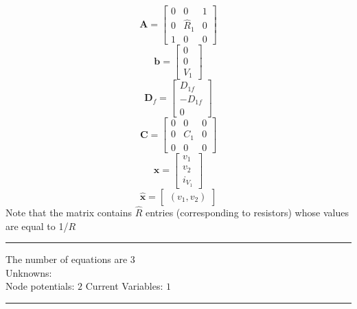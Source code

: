 \documentclass[a4paper,10pt]{report}
\begin{document}
\begin{equation}
\mathbf{A}=  
\left[ 
\begin{array}{ccc} 
0 &0  &1  \\ 
0 &\widehat{R}_1 &0  \\ 
1 &0  &0  
\end{array}
\right]
\end{equation} 
\begin{equation}
\mathbf{b}=  
\left[ 
\begin{array}{c} 
0  \\ 
0   \\ 
V_1  
\end{array}
\right]
\end{equation} 
\begin{equation}
\mathbf{D}_f=  
\left[ 
\begin{array}{c} 
D_{1f}  \\ 
-D_{1f}   \\ 
0  
\end{array}
\right]
\end{equation} 
\begin{equation}
\mathbf{C}=  
\left[ 
\begin{array}{ccc} 
0 &0  &0  \\ 
0 &C_1 &0  \\ 
0 &0  &0  
\end{array}
\right]
\end{equation} 
\begin{equation}
\mathbf{x}=  
\left[ 
\begin{array}{c} 
v_1   \\ 
v_2    \\ 
i_{V_1}  
\end{array}
\right]
\end{equation} 
\begin{equation}
\mathbf{\widehat{x}}=  
\left[ 
\begin{array}{c} 
(v_1,v_2)     
\end{array}
\right]
\end{equation} 
Note that the matrix contains $\widehat{R}$ entries (corresponding to resistors) whose values are equal to 1/$R$\\
\hrule\vspace{2mm}
The number of equations are $3$ \\
Unknowns: \\
  Node potentials: $2$ Current Variables: $1$ \\
\hrule\vspace{5mm}
\end{document}
